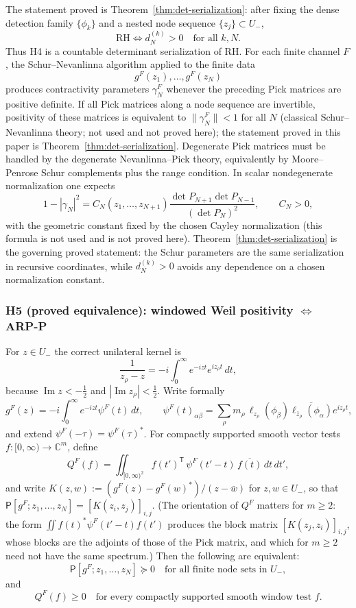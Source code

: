 \documentclass[11pt]{amsart}
\theoremstyle{definition}
\theoremstyle{remark}
\theoremstyle{definition}
\renewcommand{\Im}{\operatorname{Im}}
\newcommand{\half}{\tfrac{1}{2}}
\newcommand{\C}{\mathbb{C}}
\begin{document}
The statement proved is Theorem~\ref{thm:det-serialization}: after fixing the dense detection family
$\{\phi_k\}$ and a nested node sequence $\{z_j\}\subset U_-$,
\[
   \mathrm{RH}\Longleftrightarrow d_N^{(k)}>0\quad\text{for all }k,N.
\]
Thus H4 is a countable determinant serialization of RH.  For each finite channel $F$, the Schur--Nevanlinna algorithm applied to the finite
data
\[
   g^F(z_1),\ldots,g^F(z_N)
\]
produces contractivity parameters $\gamma_N^F$ whenever the preceding Pick matrices are positive
definite.  If all Pick matrices along a node sequence are invertible, positivity of these matrices is
equivalent to $\|\gamma_N^F\|<1$ for all $N$ (classical Schur--Nevanlinna theory; not used and not
proved here); the statement proved in this paper is
Theorem~\ref{thm:det-serialization}.  Degenerate Pick matrices must be handled by the degenerate Nevanlinna--Pick theory, equivalently by
Moore--Penrose Schur complements plus the range condition.  In scalar nondegenerate normalization one
expects
\[
   1-|\gamma_N|^2
   =
   C_N(z_1,\ldots,z_{N+1})
   \frac{\det P_{N+1}\det P_{N-1}}{(\det P_N)^2},
   \qquad C_N>0,
\]
with the geometric constant fixed by the chosen Cayley normalization (this formula is not used and is
not proved here).  Theorem~\ref{thm:det-serialization} is the governing proved statement: the Schur parameters are the same
serialization in recursive coordinates, while $d_N^{(k)}>0$ avoids any dependence on a chosen
normalization constant.

\subsubsection*{H5 (proved equivalence): windowed Weil positivity \texorpdfstring{$\Longleftrightarrow$}{<=>} ARP-P}

For $z\in U_-$ the correct unilateral kernel is
\[
   \frac1{z_\rho-z}=-i\int_0^\infty e^{-izt}e^{iz_\rho t}\,dt,
\]
because $\Im z<-\half$ and $|\Im z_\rho|<\half$.  Write formally
\[
   g^F(z)=-i\int_0^\infty e^{-izt}\psi^F(t)\,dt,
   \qquad
   \psi^F(t)_{\alpha\beta}
   =
   \sum_\rho
   m_\rho\,\ell_{z_\rho}(\phi_\beta)
   \overline{\ell_{\bar z_\rho}(\phi_\alpha)}
   e^{iz_\rho t},
\]
and extend $\psi^F(-\tau)=\psi^F(\tau)^*$.  For compactly supported smooth vector tests
$f:[0,\infty)\to\C^m$, define
\[
   Q^F(f)=
   \iint_{[0,\infty)^2}f(t')^{\mathsf T}\,\psi^F(t'-t)\,\overline{f(t)}\,dt\,dt',
\]
and write $K(z,w):=(g^F(z)-g^F(w)^*)/(z-\bar w)$ for $z,w\in U_-$, so that
$\mathsf P[g^F;z_1,\ldots,z_N]=[K(z_i,z_j)]_{i,j}$.  (The orientation of $Q^F$ matters for $m\ge2$:
the form $\iint f(t)^*\psi^F(t'-t)f(t')$ produces the block matrix $[K(z_j,z_i)]_{i,j}$, whose blocks
are the adjoints of those of the Pick matrix, and which for $m\ge2$ need not have the same spectrum.)
Then the following are equivalent:
\[
   \mathsf P[g^F;z_1,\ldots,z_N]\succeq0
   \quad\text{for all finite node sets in }U_-,
\]
and
\[
   Q^F(f)\ge0\quad\text{for every compactly supported smooth window test }f.
\]
\end{document}
